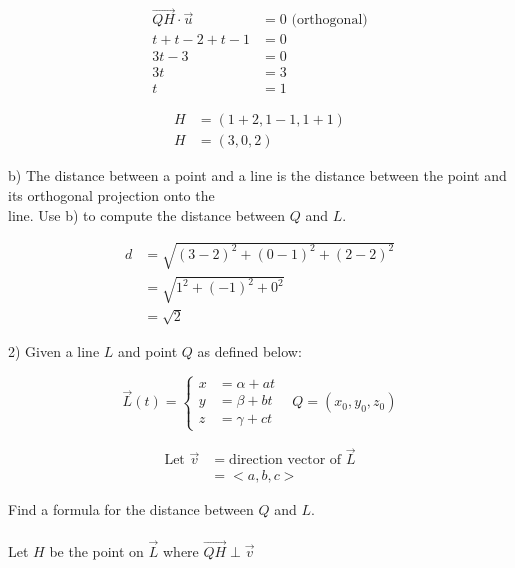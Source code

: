 \documentclass{article}
\begin{document}
\begin{align*}
\vec{QH} \cdot \vec{u} &= 0  \text{ (orthogonal)}\\
t + t - 2 + t -1 &= 0 \\
3t - 3 &= 0 \\
3t &= 3 \\
t &= 1
\end{align*}

\begin{align*}
H &= (1+2, 1-1, 1+1) \\
H &= (3, 0, 2)
\end{align*}

\begin{text}
\indent b) The distance between a point and a line is the distance between the point and its orthogonal projection onto the \\
\indent\indent\indent line.  Use b) to compute the distance between $Q$ and $L$.
\end{text}

\begin{align*}
d &= \sqrt{(3-2)^2 + (0-1)^2 + (2-2)^2} \\
  &= \sqrt{1^2 + (-1)^2 + 0^2} \\
  &= \sqrt{2}
\end{align*}

\newpage

\begin{text}
2) Given a line $L$ and point $Q$ as defined below:
\end{text}

\[\vec{L}(t) = \left\{
  \begin{array}{lr}
    x &= \alpha + at \\
    y &= \beta + bt \\
    z &= \gamma + ct
  \end{array}
\right.
\;\;\;
Q = (x_0, y_0, z_0)
\]

\begin{align*}
\text{Let } \vec{v} &= \text{direction vector of } \vec{L} \\
&= <a, b, c>
\end{align*}

\begin{text}
\indent Find a formula for the distance between $Q$ and $L$. \\ \\
\indent\indent Let $H$ be the point on $\vec{L}$ where $\vec{QH} \perp \vec{v}$
\end{text}
\end{document}
